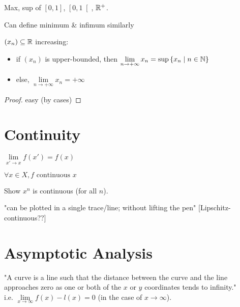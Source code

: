 \begin{question}
	Max, sup of $\left[ 0,1 \right]$, $\left[ 0,1 \right[$, $\mathbb{R}^+$.
\end{question}

\begin{remark}
	Can define minimum \& infimum similarly
\end{remark}

\begin{theorem}
	$(x_n) \subseteq \mathbb{R}$ increasing:
	\begin{itemize}
		\item if $(x_n)$ is upper-bounded, then $\lim\limits_{n \to +\infty} x_n = \sup \left\{ x_n \mid n \in \mathbb{N} \right\}$
		\item else, $\lim\limits_{n \to +\infty} x_n = +\infty$
	\end{itemize}
\end{theorem}
\begin{proof}
	easy (by cases)
\end{proof}



\section{Continuity}

\begin{definition}[$f$ continuous at $x$]
	$\lim\limits_{x' \to x} f(x') = f(x)$
\end{definition}
\begin{definition}[$f$ continuous on $X$]
	$\forall x \in X, f \text{ continuous } x$
\end{definition}
\begin{question}
	Show $x^n$ is continuous (for all $n$).
\end{question}
"can be plotted in a single trace/line; without lifting the pen"
[Lipschitz-continuous??]



\section{Asymptotic Analysis}

\begin{definition}[Asymptote]
	"A curve is a line such that the distance between the curve and the line approaches zero as one or both of the $x$ or $y$ coordinates tends to infinity." \\
	i.e. $\lim\limits_{x \to \infty} f(x)-l(x) = 0$ (in the case of $x \to \infty$).
\end{definition}
